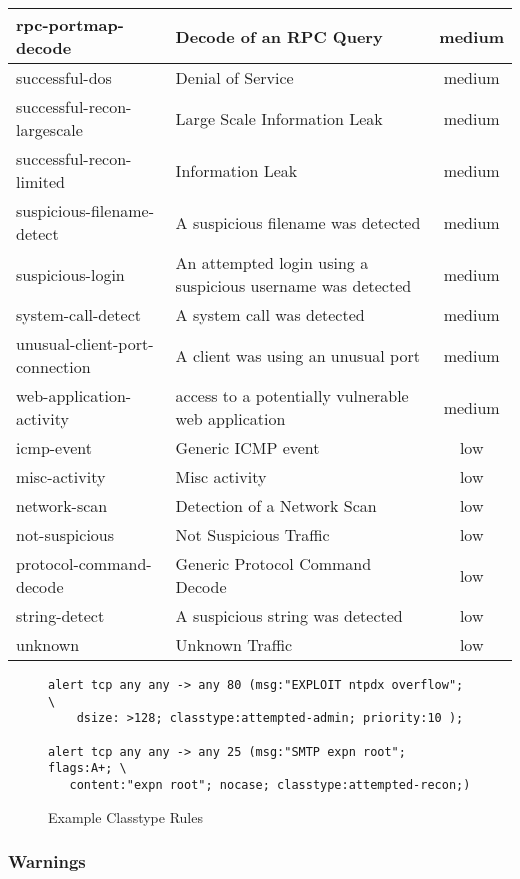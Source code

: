 \documentclass[english]{report}
\begin{document}
\begin{center}
\begin{longtable}{|p{2in}|p{2.5in}|c|}
\hline 
rpc-portmap-decode&
Decode of an RPC Query & medium\\
\hline 
successful-dos&
Denial of Service & medium\\
\hline 
successful-recon-largescale&
Large Scale Information Leak & medium\\
\hline 
successful-recon-limited&
Information Leak & medium\\
\hline 
suspicious-filename-detect&
A suspicious filename was detected & medium\\
\hline 
suspicious-login&
An attempted login using a suspicious username was detected & medium\\
\hline 
system-call-detect&
A system call was detected & medium\\
\hline 
unusual-client-port-connection&
A client was using an unusual port & medium\\
\hline 
web-application-activity&
access to a potentially vulnerable web application & medium\\
\hline
icmp-event&
Generic ICMP event & low\\
\hline 
misc-activity&
Misc activity & low\\
\hline 
network-scan&
Detection of a Network Scan & low\\
\hline 
not-suspicious&
Not Suspicious Traffic & low\\
\hline 
protocol-command-decode&
Generic Protocol Command Decode & low\\
\hline 
string-detect&
A suspicious string was detected & low\\
\hline 
unknown&
Unknown Traffic & low\\
\hline
\end{longtable}
\end{center}


\begin{figure}[!hbpt]
\begin{verbatim}
alert tcp any any -> any 80 (msg:"EXPLOIT ntpdx overflow"; \ 
    dsize: >128; classtype:attempted-admin; priority:10 );

alert tcp any any -> any 25 (msg:"SMTP expn root"; flags:A+; \
   content:"expn root"; nocase; classtype:attempted-recon;)
\end{verbatim}
\caption{Example Classtype Rules\label{example classification rules}}
\end{figure}

\subsubsection{Warnings}
\end{document}
